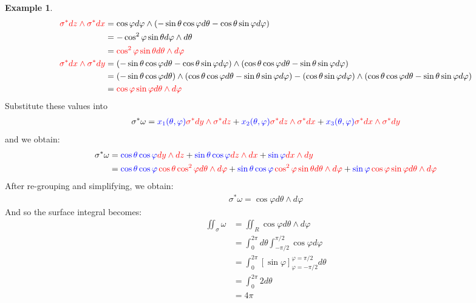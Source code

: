 \documentclass[11pt]{scrartcl}
\theoremstyle{definition}
\newtheorem{ex}{Example}
\theoremstyle{remark}
\newcommand{\idx}[2]{\int_{#1}^{#2}}
\begin{document}
{\begin{ex}
\begin{align*}
		\color{red} \sigma^* dz \wedge \sigma^* dx \color{black} & = \cos \varphi d \varphi \wedge ( - \sin \theta \cos \varphi d \theta - \cos \theta \sin \varphi d \varphi ) \\
		& = - \cos^2 \varphi \sin \theta d \varphi \wedge d \theta \\
		& = \color{red} \cos^2 \varphi \sin \theta d \theta \wedge d \varphi  \\
		\color{red} \sigma^* dx \wedge \sigma^* dy  \color{black} & = (- \sin \theta \cos \varphi d \theta - \cos \theta \sin \varphi d \varphi ) \wedge ( \cos \theta \cos \varphi d \theta - \sin \theta \sin \varphi d \varphi) \\
		& = ( - \sin \theta \cos \varphi d \theta ) \wedge ( \cos \theta \cos \varphi d \theta - \sin \theta \sin \varphi d \varphi) - ( \cos \theta \sin \varphi d \varphi) \wedge ( \cos \theta \cos \varphi d \theta - \sin \theta \sin \varphi d \varphi) \\
		& = \color{red} \cos \varphi \sin \varphi d \theta \wedge d \varphi 
	\end{align*}
	Substitute these values into
	\begin{align}
		\sigma^* \omega = \color{blue} x_1(\theta, \varphi) \color{red} \sigma^* dy \wedge  \sigma^* dz  \color{black} +  \color{blue} x_2( \theta, \varphi) \color{red} \sigma^*dz \wedge \sigma^* dx \color{black} + \color{blue} x_3(\theta, \varphi) \color{red} \sigma^* dx \wedge   \sigma^* dy		
	\end{align}
	and we obtain: 
	\begin{align*}
		\sigma^* \omega & = \color{blue} \cos \theta \cos \varphi \color{red} d y \wedge dz \color{black} + \color{blue} \sin \theta \cos \varphi \color{red} dz \wedge dx \color{black} + \color{blue} \sin \varphi \color{red} dx \wedge dy \color{black} \\
		& = \color{blue} \cos \theta \cos \varphi \color{red} \cos \theta \cos^2 \varphi d \theta \wedge d \varphi \color{black} + \color{blue} \sin \theta \cos \varphi \color{red} \cos^2 \varphi \sin \theta d \theta \wedge d \varphi \color{black} + \color{blue} \sin \varphi \color{red} \cos \varphi \sin \varphi  d \theta \wedge d \varphi 
	\end{align*}
	After re-grouping and simplifying, we obtain: 
	\begin{align*}
		\sigma^* \omega = \cos \varphi d \theta \wedge d \varphi 
	\end{align*}
	And so the surface integral becomes: 
	\begin{align*}
		\iint_\sigma \omega & = \iint_R \cos \varphi d \theta \wedge d \varphi \\
		& = \idx{0}{2 \pi} d \theta \idx{-\pi /2}{\pi /2} \cos \varphi d \varphi \\
		& = \idx{0}{2 \pi} [ \sin \varphi ]_{\varphi = -\pi / 2}^{\varphi = \pi / 2} d \theta \\
		& = \idx{0}{2 \pi}  2 d \theta \\
		& = 4 \pi 
	\end{align*}
\end{ex}

}
\end{document}
